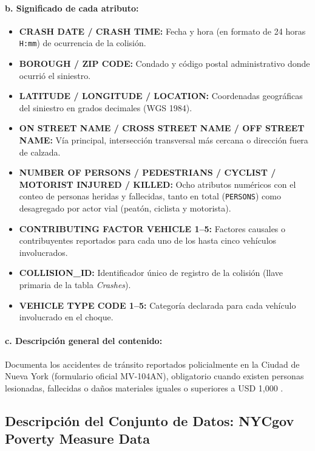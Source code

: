 \paragraph{b. Significado de cada atributo:}
\begin{itemize}
    \item \textbf{CRASH DATE / CRASH TIME:} Fecha y hora (en formato de 24 horas \texttt{H:mm}) de ocurrencia de la colisión.
    \item \textbf{BOROUGH / ZIP CODE:} Condado y código postal administrativo donde ocurrió el siniestro.
    \item \textbf{LATITUDE / LONGITUDE / LOCATION:} Coordenadas geográficas del siniestro en grados decimales (WGS 1984).
    \item \textbf{ON STREET NAME / CROSS STREET NAME / OFF STREET NAME:} Vía principal, intersección transversal más cercana o dirección fuera de calzada.
    \item \textbf{NUMBER OF PERSONS / PEDESTRIANS / CYCLIST / MOTORIST INJURED / KILLED:} Ocho atributos numéricos con el conteo de personas heridas y fallecidas, tanto en total (\texttt{PERSONS}) como desagregado por actor vial (peatón, ciclista y motorista).
    \item \textbf{CONTRIBUTING FACTOR VEHICLE 1--5:} Factores causales o contribuyentes reportados para cada uno de los hasta cinco vehículos involucrados.
    \item \textbf{COLLISION\_ID:} Identificador único de registro de la colisión (llave primaria de la tabla \textit{Crashes}).
    \item \textbf{VEHICLE TYPE CODE 1--5:} Categoría declarada para cada vehículo involucrado en el choque.
\end{itemize}

\paragraph{c. Descripción general del contenido:} Documenta los accidentes de tránsito reportados policialmente en la Ciudad de Nueva York (formulario oficial MV-104AN), obligatorio cuando existen personas lesionadas, fallecidas o daños materiales iguales o superiores a USD 1,000 \cite{nyc_collisions_crashes_2026}.

\subsection{Descripción del Conjunto de Datos: NYCgov Poverty Measure Data}
\label{subsec:desc_poverty}

